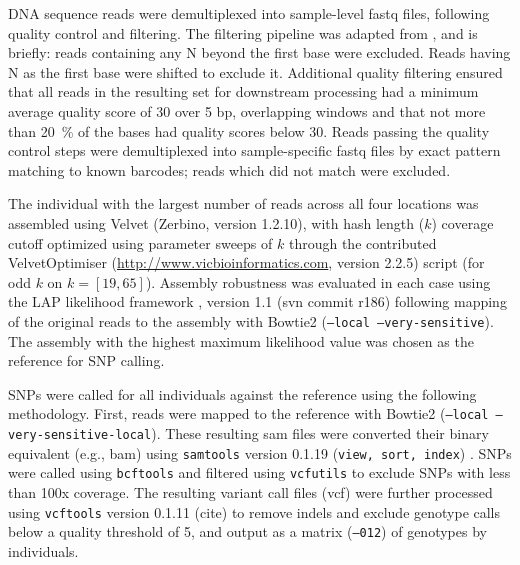 \documentclass[11pt]{article}
\begin{document}
DNA sequence reads were demultiplexed into sample-level fastq files, following quality control 
and filtering.  The filtering pipeline was adapted from \citep{Friedline:2012fm}, and is briefly: reads 
containing any N beyond the first base were excluded. Reads having N as the first base were shifted 
to exclude it.  Additional quality filtering ensured that all reads in the resulting set for downstream 
processing had a minimum average quality score of 30 over 5 bp, overlapping windows 
and that not more than \SI{20}{\percent} of the bases had quality scores below 30. Reads passing the 
quality control steps were demultiplexed into sample-specific fastq files by exact pattern matching to 
known barcodes; reads which did not match were excluded.

The individual with the largest number of reads across all four locations was assembled using 
Velvet (Zerbino, version 1.2.10), with hash length ($k$) coverage cutoff optimized using parameter sweeps of $k$ 
through the contributed VelvetOptimiser (\url{http://www.vicbioinformatics.com}, version 2.2.5) 
script (for odd $k$ on $k=[19,65]$).  Assembly robustness was evaluated in each case using the LAP likelihood 
framework \citep{Ghodsi:2013bc}, version 1.1 (svn commit r186) following mapping of the original reads to the 
assembly with Bowtie2 \citep{Langmead:2012jh} (\texttt{--local --very-sensitive}).  The assembly with the highest 
maximum likelihood value was chosen as the reference for SNP calling.

SNPs were called for all individuals against the reference using the following methodology.  First, 
reads were mapped to the reference with Bowtie2 (\texttt{--local --very-sensitive-local}).  These resulting 
sam files were converted their binary equivalent (e.g., bam) using \texttt{samtools} version 0.1.19 
(\texttt{view, sort, index}) \citep{Li:2009ka}.  SNPs were called using \texttt{bcftools} and filtered using 
\texttt{vcfutils} to exclude SNPs with less than 100x coverage. The resulting variant call files (vcf) 
were further processed using \texttt{vcftools} version 0.1.11 (cite) to remove indels and exclude genotype 
calls below a quality threshold of 5, and output as a matrix (\texttt{--012}) of genotypes by individuals.  
\end{document}

